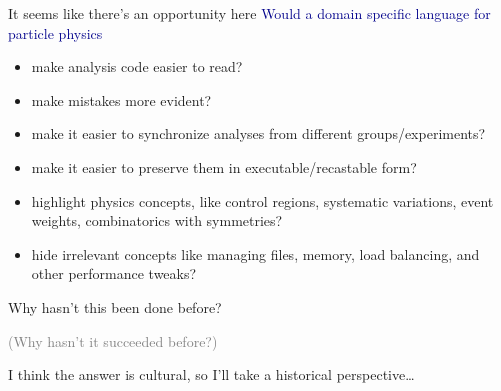 \documentclass[aspectratio=169]{beamer}
\begin{document}
\begin{frame}{It seems like there's an opportunity here}
\large
\vspace{0.5 cm}
\textcolor{darkblue}{Would a domain specific language for particle physics}

\begin{itemize}\setlength{\itemsep}{0.25 cm}
\item make analysis code easier to read?
\item make mistakes more evident?
\item make it easier to synchronize analyses from different groups/experiments?
\item make it easier to preserve them in executable/recastable form?
\item highlight physics concepts, like control regions, systematic variations, event weights, combinatorics with symmetries?
\item hide irrelevant concepts like managing files, memory, load balancing, and other performance tweaks?
\end{itemize}

\vspace{0.25 cm}
\end{frame}

\begin{frame}{}
\LARGE
\vspace{1.25 cm}
\begin{center}
Why hasn't this been done before?

\vspace{1 cm}
\textcolor{gray}{\large (Why hasn't it succeeded before?)}
\end{center}
\end{frame}

\begin{frame}{}
\Large
\vspace{1.25 cm}
\begin{center}
I think the answer is cultural, so I'll take a historical perspective\ldots
\end{center}
\end{frame}
\end{document}
